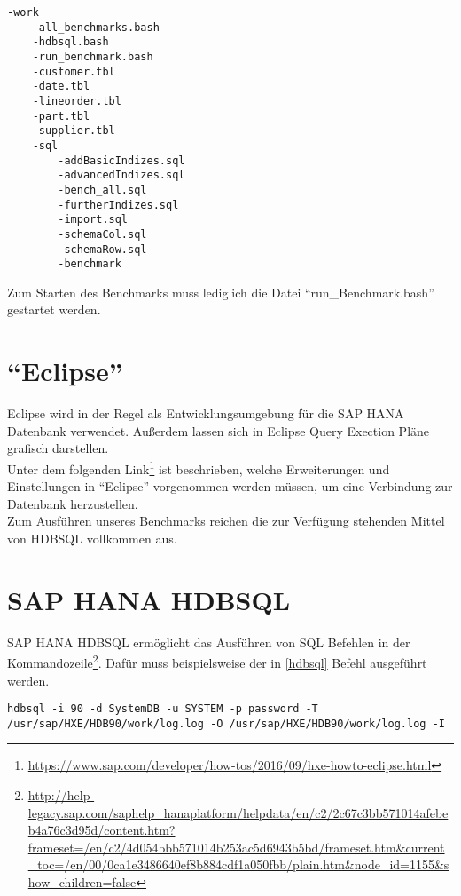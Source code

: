 \begin{lstlisting}[label=struktur, caption={Ordnerstruktur}]
-work
	-all_benchmarks.bash
	-hdbsql.bash
	-run_benchmark.bash
	-customer.tbl
	-date.tbl
	-lineorder.tbl
	-part.tbl
	-supplier.tbl
	-sql
		-addBasicIndizes.sql
		-advancedIndizes.sql
		-bench_all.sql
		-furtherIndizes.sql
		-import.sql
		-schemaCol.sql
		-schemaRow.sql
		-benchmark	
\end{lstlisting}
Zum Starten des Benchmarks muss lediglich die Datei \enquote{run\_Benchmark.bash} gestartet werden.


\section{\enquote{Eclipse}}
Eclipse wird in der Regel als Entwicklungsumgebung für die SAP HANA Datenbank verwendet. Außerdem lassen sich in Eclipse Query Exection Pläne grafisch darstellen.
\\Unter dem folgenden Link\footnote{\url{https://www.sap.com/developer/how-tos/2016/09/hxe-howto-eclipse.html}} ist beschrieben, welche Erweiterungen und Einstellungen in \enquote{Eclipse} vorgenommen werden müssen, um eine Verbindung zur Datenbank herzustellen.\\Zum Ausführen unseres Benchmarks reichen die zur Verfügung stehenden Mittel von HDBSQL vollkommen aus.

\section{SAP HANA HDBSQL}
SAP HANA HDBSQL ermöglicht das Ausführen von SQL Befehlen in der Kommandozeile\footnote{\url{http://help-legacy.sap.com/saphelp_hanaplatform/helpdata/en/c2/2c67c3bb571014afebeb4a76c3d95d/content.htm?frameset=/en/c2/4d054bbb571014b253ac5d6943b5bd/frameset.htm&current_toc=/en/00/0ca1e3486640ef8b884cdf1a050fbb/plain.htm&node_id=1155&show_children=false}}. Dafür muss beispielsweise der in \autoref{hdbsql} Befehl ausgeführt werden.
\begin{lstlisting}[label=hdbsql, caption={HDBSQL Befehl}]
hdbsql -i 90 -d SystemDB -u SYSTEM -p password -T /usr/sap/HXE/HDB90/work/log.log -O /usr/sap/HXE/HDB90/work/log.log -I
\end{lstlisting}
